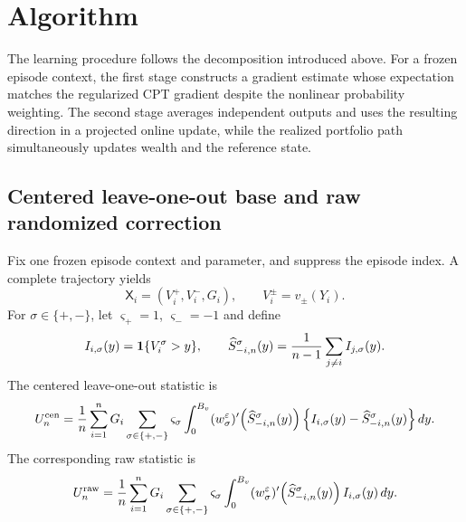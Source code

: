 \section{Algorithm}\label{sec:algorithm}

The learning procedure follows the decomposition introduced above.  For a frozen episode context, the first stage constructs a gradient estimate whose expectation matches the regularized CPT gradient despite the nonlinear probability weighting.  The second stage averages independent outputs and uses the resulting direction in a projected online update, while the realized portfolio path simultaneously updates wealth and the reference state.

\subsection{Centered leave-one-out base and raw randomized correction}

Fix one frozen episode context and parameter, and suppress the episode index.  A complete trajectory yields
\begin{equation}\label{eq:trajectory-summary}
 \mathsf X_i=(V_i^+,V_i^-,G_i),
 \qquad
 V_i^\pm=v_\pm(Y_i).
\end{equation}
For $\sigma\in\{+,-\}$, let $\varsigma_+=1$, $\varsigma_-=-1$ and define
\begin{equation}\label{eq:loo-survival}
 I_{i,\sigma}(y)=\mathbf 1\{V_i^\sigma>y\},
 \qquad
 \widehat S_{-i,n}^\sigma(y)
 =\frac1{n-1}\sum_{j\ne i}I_{j,\sigma}(y).
\end{equation}
The centered leave-one-out statistic is
\begin{equation}\label{eq:centered-loo}
 U_n^{\rm cen}
 =\frac1n\sum_{i=1}^{n}G_i
 \sum_{\sigma\in\{+,-\}}\varsigma_\sigma
 \int_0^{B_v}
 (w_\sigma^\varepsilon)'\!\left(\widehat S_{-i,n}^\sigma(y)\right)
 \left\{I_{i,\sigma}(y)-\widehat S_{-i,n}^\sigma(y)\right\}dy.
\end{equation}
The corresponding raw statistic is
\begin{equation}\label{eq:raw-loo}
 U_n^{\rm raw}
 =\frac1n\sum_{i=1}^{n}G_i
 \sum_{\sigma\in\{+,-\}}\varsigma_\sigma
 \int_0^{B_v}
 (w_\sigma^\varepsilon)'\!\left(\widehat S_{-i,n}^\sigma(y)\right)
 I_{i,\sigma}(y)\,dy.
\end{equation}

